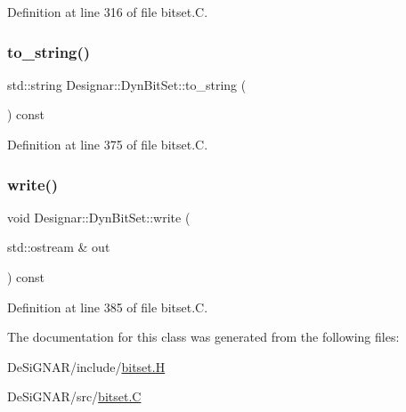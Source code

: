Definition at line 316 of file bitset.\+C.

\mbox{\label{class_designar_1_1_dyn_bit_set_ad393d0c9a7f15f022b0529fbe2983780}} 
\subsubsection{\texorpdfstring{to\+\_\+string()}{to\_string()}}
{\footnotesize\ttfamily std\+::string Designar\+::\+Dyn\+Bit\+Set\+::to\+\_\+string (\begin{DoxyParamCaption}{ }\end{DoxyParamCaption}) const}



Definition at line 375 of file bitset.\+C.

\mbox{\label{class_designar_1_1_dyn_bit_set_ac04df606a53e544d8e87d931be0abac0}} 
\subsubsection{\texorpdfstring{write()}{write()}}
{\footnotesize\ttfamily void Designar\+::\+Dyn\+Bit\+Set\+::write (\begin{DoxyParamCaption}\item[{std\+::ostream \&}]{out }\end{DoxyParamCaption}) const}



Definition at line 385 of file bitset.\+C.



The documentation for this class was generated from the following files\+:\begin{DoxyCompactItemize}
\item 
De\+Si\+G\+N\+A\+R/include/\hyperlink{bitset_8_h}{bitset.\+H}\item 
De\+Si\+G\+N\+A\+R/src/\hyperlink{bitset_8_c}{bitset.\+C}\end{DoxyCompactItemize}
